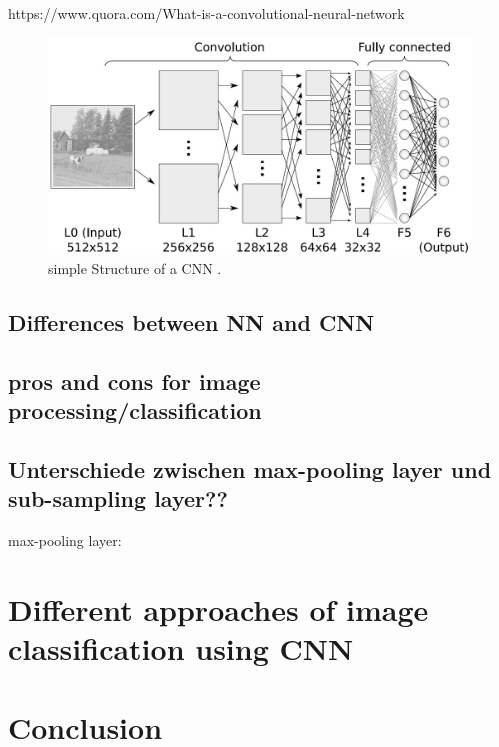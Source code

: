\documentclass{sig-alternate-05-2015}
\begin{document}
	
https://www.quora.com/What-is-a-convolutional-neural-network	
	
\begin{figure}
	\includegraphics[width=\textwidth]{../Bilder/structure-cnn.jpg}
	\caption{ simple Structure of a CNN \cite{UniBonn}.}
	\label{fig:CNNstructure}
\end{figure}
	
\subsection{Differences between NN and CNN }
\subsection{pros and cons for image processing/classification }

\subsection{Unterschiede zwischen max-pooling layer und sub-sampling layer??}
max-pooling layer: \cite{6033458}


\section{Different approaches of image classification using CNN}
\section{Conclusion}





 

\balancecolumns
\end{document}
